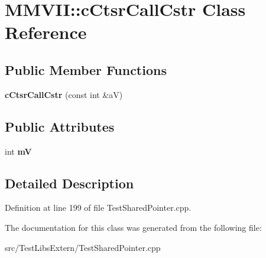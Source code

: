 \hypertarget{classMMVII_1_1cCtsrCallCstr}{}\section{M\+M\+V\+II\+:\+:c\+Ctsr\+Call\+Cstr Class Reference}
\label{classMMVII_1_1cCtsrCallCstr}
\subsection*{Public Member Functions}
\begin{DoxyCompactItemize}
\item 
{\bfseries c\+Ctsr\+Call\+Cstr} (const int \&aV)\hypertarget{classMMVII_1_1cCtsrCallCstr_a725c0698048fe153fd49723b0b39cea6}{}\label{classMMVII_1_1cCtsrCallCstr_a725c0698048fe153fd49723b0b39cea6}

\end{DoxyCompactItemize}
\subsection*{Public Attributes}
\begin{DoxyCompactItemize}
\item 
int {\bfseries mV}\hypertarget{classMMVII_1_1cCtsrCallCstr_af15bfc050033496574e7ad08b6c93434}{}\label{classMMVII_1_1cCtsrCallCstr_af15bfc050033496574e7ad08b6c93434}

\end{DoxyCompactItemize}


\subsection{Detailed Description}


Definition at line 199 of file Test\+Shared\+Pointer.\+cpp.



The documentation for this class was generated from the following file\+:\begin{DoxyCompactItemize}
\item 
src/\+Test\+Libs\+Extern/Test\+Shared\+Pointer.\+cpp\end{DoxyCompactItemize}
